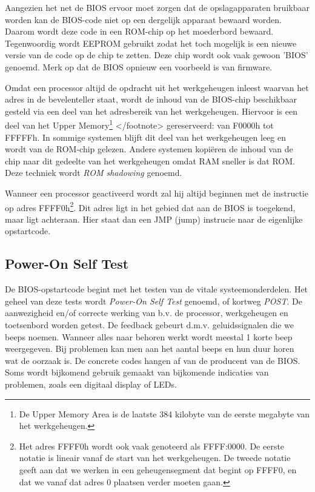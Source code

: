 Aangezien het net de BIOS ervoor moet zorgen dat de
opslagapparaten bruikbaar worden kan de BIOS-code niet op een dergelijk
apparaat bewaard worden. Daarom wordt deze code in een ROM-chip op het
moederbord bewaard. Tegenwoordig wordt EEPROM gebruikt zodat het toch
mogelijk is een nieuwe versie van de code op de chip te zetten. Deze
chip wordt ook vaak gewoon 'BIOS' genoemd. Merk op dat de BIOS opnieuw
een voorbeeld is van firmware.

Omdat een processor altijd de opdracht uit het werkgeheugen
inleest waarvan het adres in de bevelenteller staat, wordt de inhoud van
de BIOS-chip beschikbaar gesteld via een deel van het adresbereik van
het werkgeheugen. Hiervoor is een deel van het Upper Memory\footnote{De Upper
Memory Area is de laatste 384 kilobyte van de eerste megabyte van het
werkgeheugen.}
</footnote> gereserveerd: van F0000h tot FFFFFh. In sommige systemen
blijft dit deel van het werkgeheugen leeg en wordt van de ROM-chip
gelezen. Andere systemen kopi\"eren de inhoud van de chip naar dit
gedeelte van het werkgeheugen omdat RAM sneller is dat ROM. Deze
techniek wordt \emph{ROM shadowing} genoemd.

Wanneer een processor geactiveerd wordt zal hij altijd beginnen
met de instructie op adres FFFF0h\footnote{Het adres FFFF0h wordt ook vaak
genoteerd als FFFF:0000. De eerste notatie is lineair vanaf de start van het
werkgeheugen. De tweede notatie geeft aan dat we werken in een geheugensegment
dat begint op FFFF0, en dat we vanaf dat adres 0 plaatsen verder moeten gaan.}.
Dit adres ligt in het gebied dat aan de BIOS is toegekend, maar ligt achteraan.
Hier staat dan een JMP (jump) instrucie naar de eigenlijke opstartcode.

\subsection{Power-On Self Test}

De BIOS-opstartcode begint met het testen van de vitale
systeemonderdelen. Het geheel van deze tests wordt \emph{Power-On
Self Test} genoemd, of kortweg \emph{POST}.
De aanwezigheid en/of correcte werking van b.v. de processor,
werkgeheugen en toetsenbord worden getest. De feedback gebeurt d.m.v.
geluidssignalen die we beeps noemen. Wanneer alles naar behoren werkt
wordt meestal 1 korte beep weergegeven. Bij problemen kan men aan het
aantal beeps en hun duur horen wat de oorzaak is. De concrete codes
hangen af van de producent van de BIOS. Soms wordt bijkomend gebruik
gemaakt van bijkomende indicaties van problemen, zoals een digitaal
display of LEDs.
